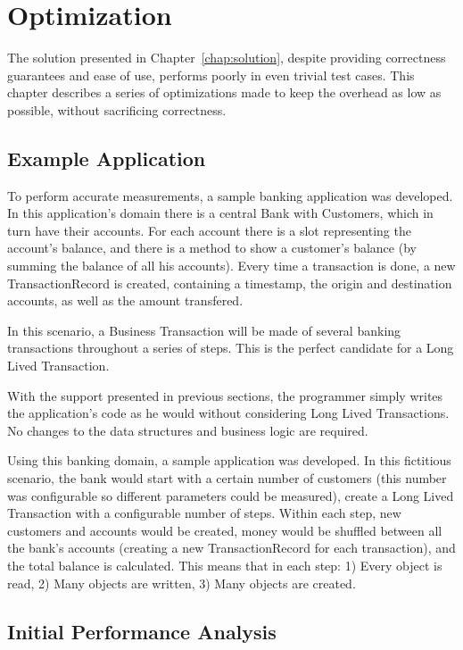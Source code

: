 \chapter{Optimization}

The solution presented in Chapter~\ref{chap:solution}, despite
providing correctness guarantees and ease of use, performs poorly in
even trivial test cases. This chapter describes a series of
optimizations made to keep the overhead as low as possible, without
sacrificing correctness.

\section{Example Application}

To perform accurate measurements, a sample banking application was
developed. In this application's domain there is a central Bank with
Customers, which in turn have their accounts. For each account there
is a slot representing the account's balance, and there is a method to
show a customer's balance (by summing the balance of all his
accounts). Every time a transaction is done, a new TransactionRecord
is created, containing a timestamp, the origin and destination
accounts, as well as the amount transfered.

In this scenario, a Business Transaction will be made of several
banking transactions throughout a series of steps. This is the perfect
candidate for a Long Lived Transaction.

With the support presented in previous sections, the programmer simply
writes the application's code as he would without considering Long
Lived Transactions. No changes to the data structures and business
logic are required.

Using this banking domain, a sample application was developed. In this
fictitious scenario, the bank would start with a certain number of
customers (this number was configurable so different parameters could
be measured), create a Long Lived Transaction with a configurable
number of steps. Within each step, new customers and accounts would be
created, money would be shuffled between all the bank's accounts
(creating a new TransactionRecord for each transaction), and the total
balance is calculated. This means that in each step: 1) Every object
is read, 2) Many objects are written, 3) Many objects are created.

\section{Initial Performance Analysis}

